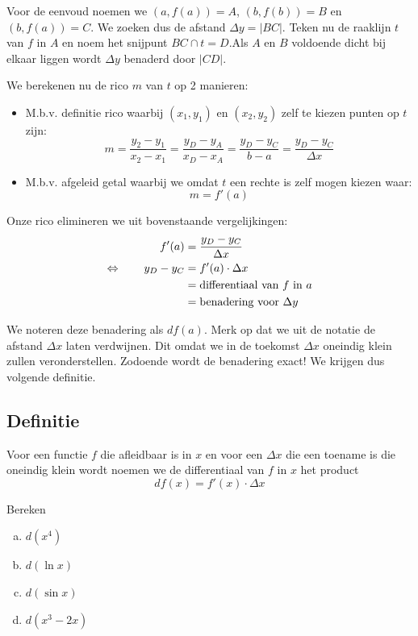 \documentclass[a4paper,12pt, twoside]{article}
\begin{document}
Voor de eenvoud noemen we $(a,f(a))=A$, $(b,f(b))=B$ en $(b,f(a))=C$. We zoeken dus de afstand $\Delta y=|BC|$. Teken nu de raaklijn $t$ van $f$ in $A$ en noem het snijpunt $BC \cap t=D$.Als $A$ en $B$ voldoende dicht bij elkaar liggen wordt $\Delta y$ benaderd door $|CD|$.

We berekenen nu de rico $m$ van $t$ op 2 manieren:
\begin{itemize}
  \item M.b.v. definitie rico waarbij $(x_1,y_1)$ en $(x_2, y_2)$ zelf te kiezen punten op $t$ zijn:
  $$m=\dfrac{y_2-y_1}{x_2-x_1}=\dfrac{y_D-y_A}{x_D-x_A}=\dfrac{y_D-y_C}{b-a}=\dfrac{y_D-y_C}{\Delta x}$$
  \item M.b.v. afgeleid getal waarbij we omdat $t$ een rechte is zelf mogen kiezen waar:
  $$m = f'(a)$$
\end{itemize}

Onze rico elimineren we uit bovenstaande vergelijkingen:
\begin{align*}
     f'(a)     &= \dfrac{y_D-y_C}{\Delta x}\\
\Leftrightarrow \qquad y_D - y_C &= f'(a)\cdot \Delta x\\
                      &= \mbox{differentiaal van $f$ in $a$}\\
                      &= \mbox{benadering voor $\Delta y$}\\
\end{align*}

We noteren deze benadering als $df(a)$. Merk op dat we uit de notatie de afstand $\Delta x$ laten verdwijnen. Dit omdat we in de toekomst $\Delta x$ oneindig klein zullen veronderstellen. Zodoende wordt de benadering exact! We krijgen dus volgende definitie.

\subsection{Definitie}
Voor een functie $f$ die afleidbaar is in $x$ en voor een $\Delta x$ die een toename is die oneindig klein wordt noemen we de differentiaal van $f$ in $x$ het product
$$df(x)=f'(x)\cdot\Delta x$$



\begin{oefening}
Bereken
\begin{multicols}{2}
\begin{enumerate}[(a)]
  \itemsep1em
  \item $\displaystyle d(x^4)$
  \item $\displaystyle d(\ln x)$
  \item $\displaystyle d(\sin x)$
  \item $\displaystyle d(x^3-2x)$
\end{enumerate}
\end{multicols}
\end{oefening}
\end{document}
